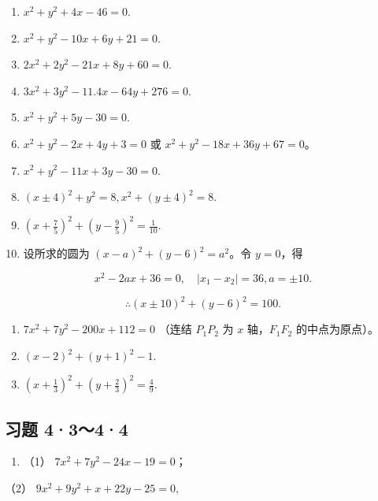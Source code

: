 \begin{enumerate}
\def\labelenumi{\arabic{enumi}.}
\setcounter{enumi}{1}
\item
  \(x^{2} + y^{2} + 4x - 46 = 0.\)
\item
  \(x^{2} + y^{2} - 10x + 6y + 21 = 0.\)
\item
  \(2x^{2} + 2y^{2} - 21x + 8y + 60 = 0.\)
\item
  \(3x^{2} + 3y^{2} - 11.4x - 64y + 276 = 0.\)
\item
  \(x^{2} + y^{2} + 5y - 30 = 0.\)
\item
  \(x^{2} + y^{2} - 2x + 4y + 3 = 0\) 或
  \(x^{2} + y^{2} - 18x + 36y + 67 = 0\)。
\item
  \(x^{2} + y^{2} - 11x + 3y - 30 = 0.\)
\item
  \((x \pm 4)^{2} + y^{2} = 8, x^{2} + (y \pm 4)^{2} = 8.\)
\item
  \(\left(x + \frac{7}{5}\right)^2 +\left(y - \frac{9}{5}\right)^2 = \frac{1}{10}.\)
\item
  设所求的圆为 \((x - a)^2 + (y - 6)^2 = a^2\)。令 \(y = 0\)，得
\end{enumerate}

\[
x^{2} - 2 a x + 36 = 0, \quad | x_{1} - x_{2} | = 36, a = \pm 10.
\]

\[
\therefore (x \pm 10) ^ {2} + (y - 6) ^ {2} = 100.
\]

\begin{enumerate}
\def\labelenumi{\arabic{enumi}.}
\setcounter{enumi}{14}
\item
  \(7x^{2} + 7y^{2} - 200x + 112 = 0\) （连结 \(P_{1}P_{2}\) 为 \(x\)
  轴，\(F_{1}F_{2}\) 的中点为原点）。
\item
  \((x - 2)^{2} + (y + 1)^{2} - 1.\)
\item
  \(\left(x + \frac{1}{3}\right)^2 +\left(y + \frac{2}{3}\right)^2 = \frac{4}{9}.\)
\end{enumerate}

\subsection{习题 4·3～4·4}\label{ux4e60ux9898-4344}

\begin{enumerate}
\def\labelenumi{\arabic{enumi}.}
\tightlist
\item
  （1） \(7x^{2} + 7y^{2} - 24x - 19 = 0\)；
\end{enumerate}

（2） \(9x^{2} + 9y^{2} + x + 22y - 25 = 0,\)

